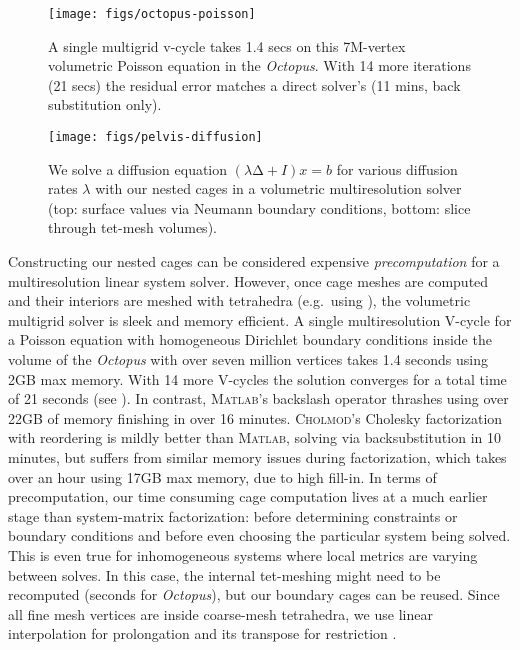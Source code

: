 \begin{figure}
  \texttt{[image: figs/octopus-poisson]}
  \caption{A single multigrid v-cycle takes 1.4 secs on this 7M-vertex
  volumetric Poisson equation in the \emph{Octopus}. With 14 more iterations
  (21 secs) the residual error matches a direct solver's (11 mins, back
  substitution only).}
  \label{fig:octopus-poisson}
\end{figure}
\begin{figure}
  \texttt{[image: figs/pelvis-diffusion]}
  \caption{We solve a diffusion equation $(λ∆+I) x = b$ for various diffusion
  rates $λ$ with our nested cages in a volumetric multiresolution solver (top:
  surface values via Neumann boundary conditions, bottom: slice through
  tet-mesh volumes).}
  \label{fig:pelvis-diffusion}
\end{figure}

Constructing our nested cages can be considered expensive \emph{precomputation}
for a multiresolution linear system solver.
%
However, once cage meshes are computed and their interiors are meshed with
tetrahedra (e.g.\ using \cite{tetgen}),
the volumetric multigrid solver is sleek and memory efficient.
%
A single multiresolution V-cycle for a Poisson equation with homogeneous
Dirichlet boundary conditions inside the volume of the \emph{Octopus} with over
seven million vertices takes 1.4 seconds using 2GB max memory. With 14 more
V-cycles the solution converges for a total time of 21 seconds (see
).
%
In contrast, \textsc{Matlab}'s backslash operator thrashes\newhl{,} using over 22GB
of memory  finishing in over 16 minutes.
%
\textsc{Cholmod}'s Cholesky factorization with reordering is mildly better than
\textsc{Matlab}, solving via backsubstitution in 10 minutes, but suffers from
similar memory issues during factorization, which takes over
an hour using 17GB max memory, due to high fill-in.
%
In terms of precomputation, our time consuming cage computation lives at a much
earlier stage than system-matrix factorization: before determining constraints
or boundary conditions and before even choosing the particular system being
solved.
%
This is even true for inhomogeneous systems where local metrics are
varying between solves. In this case, the internal tet-meshing might need to be
recomputed (seconds for \emph{Octopus}), but our boundary cages can be reused.
%
Since all fine mesh vertices are inside coarse-mesh tetrahedra, we use linear
interpolation for prolongation and its transpose for restriction
\cite{Demmel04}.

